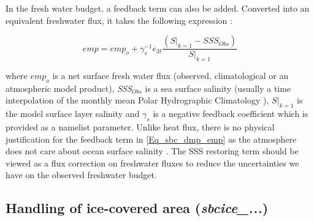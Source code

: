 In the fresh water budget, a feedback term can also be added. Converted into an 
equivalent freshwater flux, it takes the following expression :

\begin{equation} \label{Eq_sbc_dmp_emp}
\textit{emp} = \textit{emp}_o + \gamma_s^{-1} e_{3t}  \frac{  \left(\left.S\right|_{k=1}-SSS_{Obs}\right)}
												         {\left.S\right|_{k=1}}
\end{equation}

where $\textit{emp}_{o }$ is a net surface fresh water flux (observed, climatological or an
atmospheric model product), \textit{SSS}$_{Obs}$ is a sea surface salinity (usually a time 
interpolation of the monthly mean Polar Hydrographic Climatology \citep{Steele2001}), 
$\left.S\right|_{k=1}$ is the model surface layer salinity and $\gamma_s$ is a negative 
feedback coefficient which is provided as a namelist parameter. Unlike heat flux, there is no 
physical justification for the feedback term in \ref{Eq_sbc_dmp_emp} as the atmosphere 
does not care about ocean surface salinity \citep{Madec1997}. The SSS restoring 
term should be viewed as a flux correction on freshwater fluxes to reduce the 
uncertainties we have on the observed freshwater budget.

\subsection{Handling of ice-covered area  (\textit{sbcice\_...})}
\label{SBC_ice-cover}

